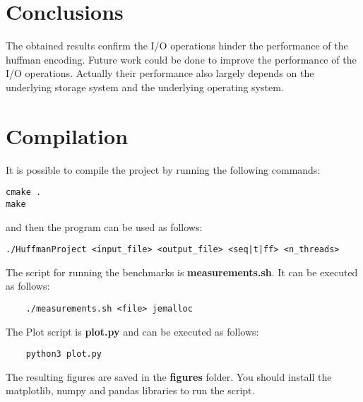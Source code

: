 \documentclass{article}
\begin{document}
\break
\section {Conclusions}
The obtained results confirm the I/O operations hinder the performance of the huffman encoding.
Future work could be done to improve the performance of the I/O operations.
Actually their performance also largely depends on the underlying storage system and
the underlying operating system.

\section{Compilation}
It is possible to compile the project by running the following commands:
\begin{verbatim}
cmake .
make
\end{verbatim}

and then the program can be used as follows:
\begin{verbatim}
./HuffmanProject <input_file> <output_file> <seq|t|ff> <n_threads>
\end{verbatim}

The script for running the benchmarks is \textbf{measurements.sh}.
It can be executed as follows:
\begin{verbatim}
    ./measurements.sh <file> jemalloc
\end{verbatim}

The Plot script is \textbf{plot.py} and can be executed as follows:
\begin{verbatim}
    python3 plot.py
\end{verbatim}

The resulting figures are saved in the \textbf{figures} folder.
You should install the matplotlib, numpy and pandas libraries to run the script.
\end{document}
